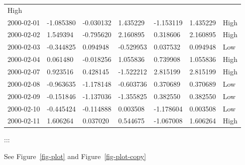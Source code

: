 \documentclass[
  letterpaper,
  DIV=11,
  numbers=noendperiod]{scrreport}
\begin{document}
\begin{longtable}[]{@{}lllllll@{}}
High \\
2000-02-01 & -1.085380 & -0.030132 & 1.435229 & -1.153119 & 1.435229 &
High \\
2000-02-02 & 1.549394 & -0.795620 & 2.160895 & 0.318606 & 2.160895 &
High \\
2000-02-03 & -0.344825 & 0.094948 & -0.529953 & 0.037532 & 0.094948 &
Low \\
2000-02-04 & 0.061480 & -0.018256 & 1.055836 & 0.739908 & 1.055836 &
High \\
2000-02-07 & 0.923516 & 0.428145 & -1.522212 & 2.815199 & 2.815199 &
High \\
2000-02-08 & -0.963635 & -1.178148 & -0.603736 & 0.370689 & 0.370689 &
Low \\
2000-02-09 & -0.151846 & -1.137036 & -1.355825 & 0.382550 & 0.382550 &
Low \\
2000-02-10 & -0.445424 & -0.114888 & 0.003508 & -1.178604 & 0.003508 &
Low \\
2000-02-11 & 1.606264 & 0.037020 & 0.544675 & -1.067008 & 1.606264 &
High \\
\bottomrule()
\end{longtable}

:::

See Figure~\ref{fig-plot} and Figure~\ref{fig-plot-copy}
\end{document}
